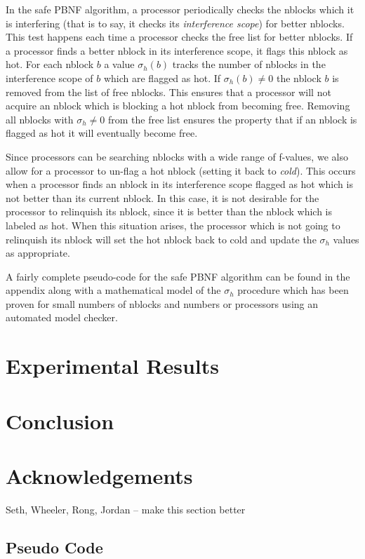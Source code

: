\documentclass{article}
\begin{document}
In the safe PBNF algorithm, a processor periodically checks the
nblocks which it is interfering (that is to say, it checks its
\emph{interference scope}) for better nblocks.  This test happens each
time a processor checks the free list for better nblocks.  If a
processor finds a better nblock in its interference scope, it flags
this nblock as hot.  For each nblock $b$ a value $\sigma_h(b)$ tracks
the number of nblocks in the interference scope of $b$ which are
flagged as hot.  If $\sigma_h(b) \neq 0$ the nblock $b$ is removed
from the list of free nblocks.  This ensures that a processor will not
acquire an nblock which is blocking a hot nblock from becoming free.
Removing all nblocks with $\sigma_h \neq 0$ from the free list ensures
the property that if an nblock is flagged as hot it will eventually
become free.

Since processors can be searching nblocks with a wide range of
f-values, we also allow for a processor to un-flag a hot nblock
(setting it back to \emph{cold}).  This occurs when a processor finds
an nblock in its interference scope flagged as hot which is not better
than its current nblock.  In this case, it is not desirable for the
processor to relinquish its nblock, since it is better than the nblock
which is labeled as hot.  When this situation arises, the processor
which is not going to relinquish its nblock will set the hot nblock
back to cold and update the $\sigma_h$ values as appropriate.

A fairly complete pseudo-code for the safe PBNF algorithm can be found
in the appendix along with a mathematical model of the $\sigma_h$
procedure which has been proven for small numbers of nblocks and
numbers or processors using an automated model checker.

\section{Experimental Results}

\section{Conclusion}

\section{Acknowledgements}

Seth, Wheeler, Rong, Jordan -- make this section better




\begin{appendices}
\section{Pseudo Code}

\end{appendices}
\end{document}
